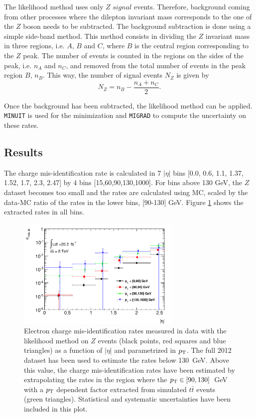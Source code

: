 The likelihood method uses only $Z$ $signal$ events. Therefore, background coming from other processes where the dilepton invariant mass corresponds to the one of the $Z$ boson needs to be subtracted. The background subtraction is done using a simple side-band method.   This method consists in dividing the $Z$ invariant mass in three regions, i.e. $A$, $B$ and $C$, where $B$ is the central region corresponding to the $Z$ peak. The number of events is counted in the regions on the sides of the peak, i.e. $n_A$ and $n_C$, and removed  from the total number of events in the peak region $B$, $n_B$. This way, the number of signal events $N_Z$ is given by
\begin{equation}
N_Z=n_B-\frac{n_A+n_C}{2}.
\end{equation}
  
 Once the background has been subtracted, the likelihood method can be applied. {\tt MINUIT} is used for the minimization and {\tt MIGRAD} to compute the uncertainty on these rates. 


\subsection{Results}

The charge mis-identification rate is calculated in 7 $|\eta|$ bins [0.0, 0.6, 1.1, 1.37, 1.52, 1.7, 2.3, 2.47] by 4 \pt bins [15,60,90,130,1000]. For \pt bins above 130 GeV, the $Z$ dataset becomes too small and the rates are calculated using \ttbar MC, scaled by the data-MC ratio of the rates in the lower \pt bins, [90-130] GeV. Figure \ref{figure:background_cf} shows the extracted rates in all bins.

\begin{figure}[ht!]
\centering
\includegraphics[width=0.7\textwidth]{figs/qmis/Rates2D}
  \caption{Electron charge mis-identification rates  measured in data with the likelihood method  on $Z$ events (black points, red squares and blue triangles) as a function of $|\eta|$ and parametrized in $p_{\rm T}$. The full 2012 dataset has been used to estimate the rates below 130~GeV.   Above this value, the charge mis-identification rates have been estimated by extrapolating the rates in the region where the $p_{\rm T}\in[90,130]$~GeV with a $p_{\rm T}$ dependent factor extracted from simulated $t\bar t$ events (green triangles). Statistical and systematic uncertainties  have been included in this plot. \label{figure:background_cf}}
\end{figure}


